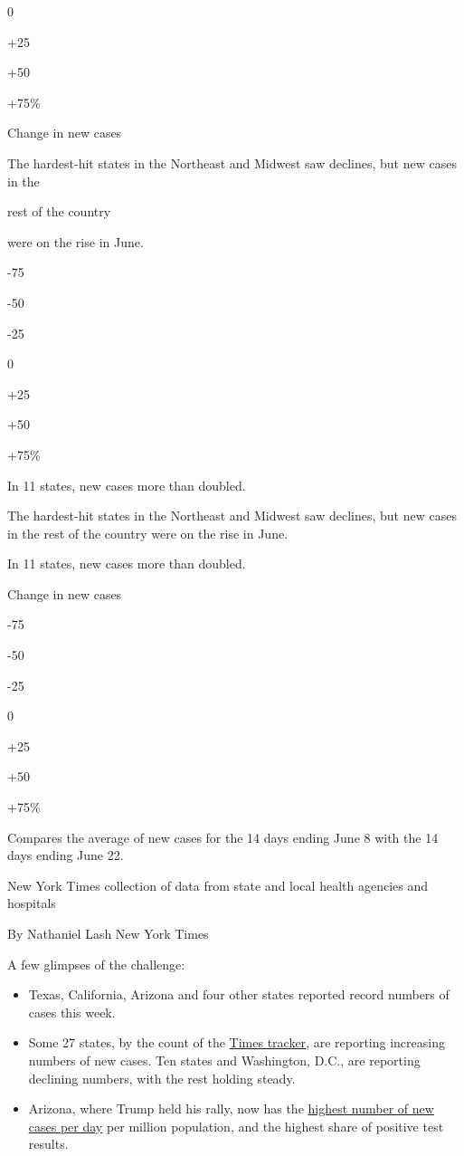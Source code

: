 0

+25

+50

+75\%

Change in new cases

The hardest-hit states in the Northeast and Midwest saw declines, but
new cases in the

rest of the country

were on the rise in June.

-75

-50

-25

0

+25

+50

+75\%

In 11 states, new cases more than doubled.

The hardest-hit states in the Northeast and Midwest saw declines, but
new cases in the rest of the country were on the rise in June.

In 11 states, new cases more than doubled.

Change in new cases

-75

-50

-25

0

+25

+50

+75\%

Compares the average of new cases for the 14 days ending June 8 with the
14 days ending June 22.

New York Times collection of data from state and local health agencies
and hospitals

By Nathaniel Lash \textbar{} New York Times

A few glimpses of the challenge:

\begin{itemize}
\item
  Texas, California, Arizona and four other states reported record
  numbers of cases this week.
\item
  Some 27 states, by the count of the
  \href{https://www.nytimes.com/interactive/2020/us/coronavirus-us-cases.html}{Times
  tracker}, are reporting increasing numbers of new cases. Ten states
  and Washington, D.C., are reporting declining numbers, with the rest
  holding steady.
\item
  Arizona, where Trump held his rally, now has the
  \href{https://www.covidexitstrategy.org/}{highest number of new cases
  per day} per million population, and the highest share of positive
  test results.
\end{itemize}

